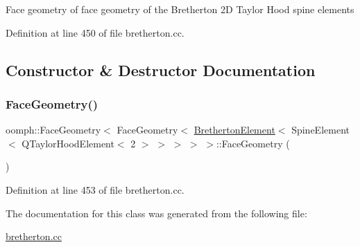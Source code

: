 Face geometry of face geometry of the Bretherton 2D Taylor Hood spine elements 

Definition at line 450 of file bretherton.\+cc.



\subsection{Constructor \& Destructor Documentation}
\mbox{\label{classoomph_1_1FaceGeometry_3_01FaceGeometry_3_01BrethertonElement_3_01SpineElement_3_01QTaylorHoa5ee68c3d3e62f3e07a972f1f9faface_a35e4c88e39164f318d20e3c7e4ddadc1}} 
\subsubsection{\texorpdfstring{Face\+Geometry()}{FaceGeometry()}}
{\footnotesize\ttfamily oomph\+::\+Face\+Geometry$<$ Face\+Geometry$<$ \hyperlink{classBrethertonElement}{Bretherton\+Element}$<$ Spine\+Element$<$ Q\+Taylor\+Hood\+Element$<$ 2 $>$ $>$ $>$ $>$ $>$\+::Face\+Geometry (\begin{DoxyParamCaption}{ }\end{DoxyParamCaption})\hspace{0.3cm}{\ttfamily [inline]}}



Definition at line 453 of file bretherton.\+cc.



The documentation for this class was generated from the following file\+:\begin{DoxyCompactItemize}
\item 
\hyperlink{bretherton_8cc}{bretherton.\+cc}\end{DoxyCompactItemize}

